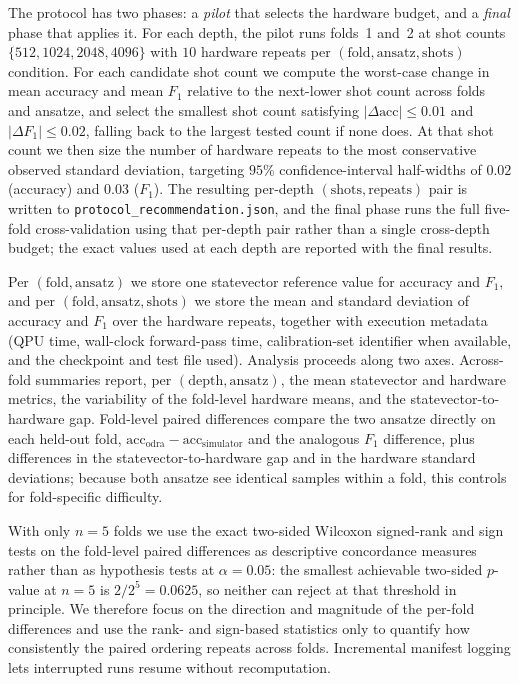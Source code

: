 \documentclass[11pt]{article}
\begin{document}
The protocol has two phases: a \emph{pilot} that selects the hardware budget, and a \emph{final} phase that applies it. For each depth, the pilot runs folds~1 and~2 at shot counts $\{512, 1024, 2048, 4096\}$ with $10$ hardware repeats per $(\text{fold}, \text{ansatz}, \text{shots})$ condition. For each candidate shot count we compute the worst-case change in mean accuracy and mean $F_1$ relative to the next-lower shot count across folds and ansatze, and select the smallest shot count satisfying $|\Delta\text{acc}| \leq 0.01$ and $|\Delta F_1| \leq 0.02$, falling back to the largest tested count if none does. At that shot count we then size the number of hardware repeats to the most conservative observed standard deviation, targeting $95\%$ confidence-interval half-widths of $0.02$ (accuracy) and $0.03$ ($F_1$). The resulting per-depth $(\text{shots}, \text{repeats})$ pair is written to \texttt{protocol\_recommendation.json}, and the final phase runs the full five-fold cross-validation using that per-depth pair rather than a single cross-depth budget; the exact values used at each depth are reported with the final results.

Per $(\text{fold}, \text{ansatz})$ we store one statevector reference value for accuracy and $F_1$, and per $(\text{fold}, \text{ansatz}, \text{shots})$ we store the mean and standard deviation of accuracy and $F_1$ over the hardware repeats, together with execution metadata (QPU time, wall-clock forward-pass time, calibration-set identifier when available, and the checkpoint and test file used). Analysis proceeds along two axes. Across-fold summaries report, per $(\text{depth}, \text{ansatz})$, the mean statevector and hardware metrics, the variability of the fold-level hardware means, and the statevector-to-hardware gap. Fold-level paired differences compare the two ansatze directly on each held-out fold, $\text{acc}_{\text{odra}} - \text{acc}_{\text{simulator}}$ and the analogous $F_1$ difference, plus differences in the statevector-to-hardware gap and in the hardware standard deviations; because both ansatze see identical samples within a fold, this controls for fold-specific difficulty.

With only $n = 5$ folds we use the exact two-sided Wilcoxon signed-rank and sign tests on the fold-level paired differences as descriptive concordance measures rather than as hypothesis tests at $\alpha = 0.05$: the smallest achievable two-sided $p$-value at $n = 5$ is $2/2^{5} = 0.0625$, so neither can reject at that threshold in principle. We therefore focus on the direction and magnitude of the per-fold differences and use the rank- and sign-based statistics only to quantify how consistently the paired ordering repeats across folds. Incremental manifest logging lets interrupted runs resume without recomputation.
\end{document}
